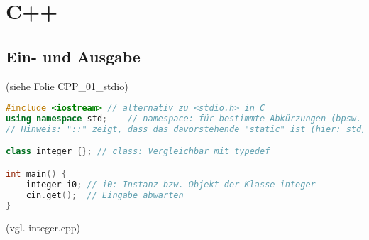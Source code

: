 \chapter{C++}
\section{Ein- und Ausgabe}
(siehe Folie CPP\_01\_stdio)
\begin{lstlisting}[language=C++]
#include <iostream>	// alternativ zu <stdio.h> in C
using namespace std;	// namespace: für bestimmte Abkürzungen (bpsw. cout anstatt std::cout)
// Hinweis: "::" zeigt, dass das davorstehende "static" ist (hier: std)

class integer {}; // class: Vergleichbar mit typedef

int main() {
	integer i0;	// i0: Instanz bzw. Objekt der Klasse integer
	cin.get();	// Eingabe abwarten
}
\end{lstlisting}
(vgl. integer.cpp)
